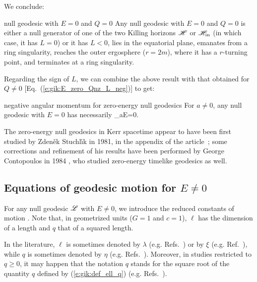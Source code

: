 We conclude:
\begin{tprop}{null geodesic with $E=0$ and $Q=0$}{}
Any null geodesic with $E=0$ and $Q=0$
is either a null generator of one of the two Killing horizons
$\mathscr{H}$ or $\mathscr{H}_{\rm in}$ (in which case, it has $L=0$) or it has
$L < 0$, lies in the equatorial plane,
emanates from a ring singularity, reaches the outer ergosphere ($r=2m$),
where it has a $r$-turning point, and terminates at a ring singularity.
\end{tprop}

Regarding the sign of $L$, we can combine the above result with that
obtained for $Q\neq 0$ [Eq.~(\ref{e:gik:E_zero_Qnz_L_neg})] to get:
\begin{tprop}{negative angular momentum for zero-energy null geodesics}{}
For $a\neq 0$, any null geodesic with $E=0$ has necessarily
\be
    _{{a\atop E=0}}.
\ee
\end{tprop}

\begin{hist}
The zero-energy null geodesics in Kerr spacetime appear to have been first
studied by Zden\v{e}k Stuchl\'{\i}k in 1981, in the appendix
of the article~\cite{Stuch81}; some corrections and refinement of his results have been
performed by George Contopoulos in 1984 \cite{Conto84},
who studied zero-energy timelike geodesics as well.
\end{hist}

\subsection{Equations of geodesic motion for \texorpdfstring{$E\neq 0$}{E nonzero}} \label{s:gik:eom_Enonzero}

For any null geodesic $\mathscr{L}$ with $E\neq 0$, we introduce the reduced constants of motion
\be \label{e:gik:def_ell_q}
     \qand
     .
\ee
Note that, in geometrized units ($G=1$ and $c=1$), $\ell$ has the dimension of
a length and $q$ that of a squared length.

\begin{remark}
In the literature, $\ell$ is sometimes denoted by $\lambda$ (e.g. Refs.~\cite{Barde73a,GrallL20b,DokucN20a})
or by $\xi$ (e.g. Ref.~\cite{Chand83}), while $q$ is sometimes denoted by
$\eta$ (e.g. Refs.~\cite{Barde73a,Chand83,GrallL20b}). Moreover, in studies restricted
to $q\geq 0$, it may happen that the notation $q$ stands for the square root of the quantity $q$ defined by
(\ref{e:gik:def_ell_q}) (e.g. Refs.~\cite{DexteA09,GrallLS18,DokucN20a}).
\end{remark}

